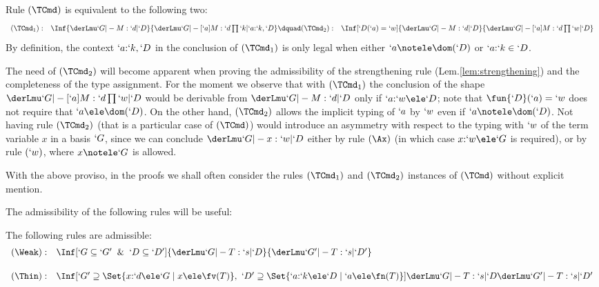 \documentclass{lmcs}
\begin{document}
 \begin{rem} \label{rem:TCmd-rule}
Rule $(\TCmd)$ is equivalent to the following two:
%
 \[ \begin{array}[t]{rl@{\dquad}rl}
(\TCmd_1 ) : &
\Inf	{\derLmu `G |- M : `d | `D }
	{\derLmu `G |- [`a]M : `d\prod `k | `a{:}`k,`D } &
(\TCmd_2) : &
\Inf	[`D(`a) = `w]
	{\derLmu `G |- M : `d | `D }
	{\derLmu `G |- [`a]M : `d\prod `w | `D }
 \end{array} \]
By definition, the context $`a{:}`k,`D $ in the conclusion of $(\TCmd_1)$ is only legal when either $`a\notele \dom(`D)$ or $`a{:}`k\in`D $.

The need of $(\TCmd_2)$ will become apparent when proving the admissibility of the strengthening rule (Lem.\skp\ref{lem:strengthening}) and the completeness of the type assignment. 
For the moment we observe that with $(\TCmd_1 )$ the conclusion of the shape $ \derLmu `G |- {[`a]}M : {`d\prod `w} | `D $ would be derivable from $ \derLmu `G |- M : `d | `D $ only if
$`a{:}`w\ele `D $; note that $\fun{`D }(`a)=`w$ does not require that $`a\ele \dom(`D)$. 
On the other hand, $(\TCmd_2)$ allows the implicit typing of $`a$ by $`w$ even if $`a\notele \dom(`D)$.
Not having rule $(\TCmd_2)$ (that is a particular case of $(\TCmd)$) would introduce an asymmetry with respect to the typing with $`w$ of the term variable $x$ in a basis $`G$, since we can conclude $ \derLmu `G |- x : `w | `D $ either by rule $(\Ax)$ (in which case $x{:}`w \ele `G$ is required), or by rule $(`w)$, where $x\notele `G$ is allowed.

With the above proviso, in the proofs we shall often consider the rules $(\TCmd_1 )$ and $(\TCmd_2 )$ instances of $(\TCmd)$ without explicit mention.
 \end{rem} 


The admissibility of the following rules will be useful:

 \begin{lem} \label{lem:weakening}
The following rules are admissible:
%
 \[ \begin{array}{rl}
(\Weak): &
\Inf	[ `G \subseteq `G' \And `D \subseteq `D' ]
	{ \derLmu `G |- T : `s | `D 
	}{ \derLmu `G' |- T : `s | `D' }
 \\ [5mm]
(\Thin): &
\Inf	[`G' \supseteq \Set {x{:}`d\ele`G \mid x \ele \fv(T) }, ~ `D' \supseteq \Set {`a{:}`k\ele`D \mid `a \ele \fn(T) }]
	{\derLmu `G |- T : `s | `D
	}{\derLmu `G' |- T : `s | `D' }
 \end{array} \] 
 \end{lem}
\end{document}
